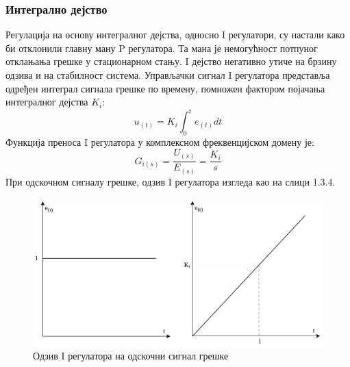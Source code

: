 \documentclass[12pt]{article}
\begin{document}
\subsubsection{Интегрално дејство}
Регулација на основу интегралног дејства, односно I регулатори, су настали како би отклонили главну ману P регулатора. Та мана је немогућност потпуног отклањања грешке у стационарном стању. I дејство негативно утиче на брзину одзива и на стабилност система. Управљачки сигнал I регулатора представља одређен интеграл сигнала грешке по времену, помножен фактором појачања интегралног дејства $K_i$:
\begin{equation}
    u_{(t)} = K_i\int_{0}^{t}e_{(t)}dt
\end{equation}
Функција преноса I регулатора у комплексном фреквенцијском домену је:
\begin{equation}
    G_{i(s)} = \dfrac{U_{(s)}}{E_{(s)}} = \dfrac{K_i}{s}
\end{equation}
При одскочном сигналу грешке, одзив I регулатора изгледа као на слици 1.3.4.
\begin{figure}[H]
    \centering
    \includegraphics[width=13cm]{figures/i.drawio.png}
    \caption{Одзив I регулатора на одскочни сигнал грешке}
    \label{fig:I_одзив}
\end{figure}
\end{document}
